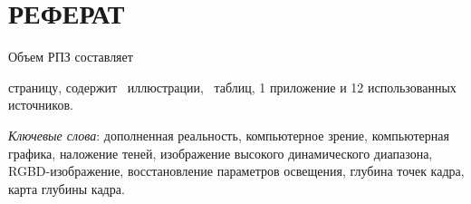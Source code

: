 \chapter*{РЕФЕРАТ}

Объем РПЗ составляет \begin{NoHyper}\pageref{LastPage}\end{NoHyper} страницу, содержит \totfig~иллюстрации, \tottab~таблиц, 1 приложение и 12 использованных источников.

\textit{Ключевые слова}: дополненная реальность, компьютерное зрение, компьютерная графика, наложение теней, изображение высокого динамического диапазона, RGBD-изображение, восстановление параметров освещения, глубина точек кадра, карта глубины кадра.